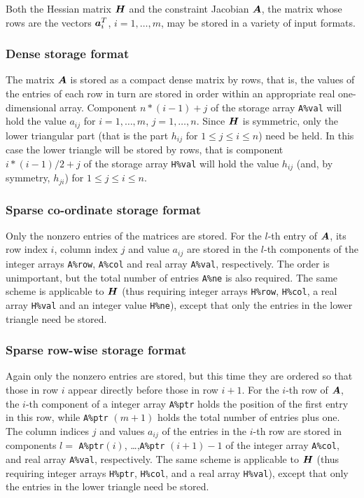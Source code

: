 \documentclass{galahad}
\begin{document}

\galmatrix
Both the Hessian matrix ${\bm{H}}$ and
the constraint Jacobian ${\bm{A}}$, the matrix
whose rows are the vectors ${\bm{a}}_{i}^{T}$, $i = 1, \ldots , m$,
may be stored in a variety of input formats.

\subsubsection{Dense storage format}\label{dense}
The matrix ${\bm{A}}$ is stored as a compact
dense matrix by rows, that is, the values of the entries of each row in turn are
stored in order within an appropriate real one-dimensional array.
Component $n \ast (i-1) + j$ of the storage array {\tt A\%val} will hold the
value $a_{ij}$ for $i = 1, \ldots , m$, $j = 1, \ldots , n$.
Since ${\bm{H}}$ is symmetric, only the lower triangular part (that is the part
$h_{ij}$ for $1 \leq j \leq i \leq n$) need be held. In this case
the lower triangle will be stored by rows, that is
component $i \ast (i-1)/2 + j$ of the storage array {\tt H\%val}
will hold the value $h_{ij}$ (and, by symmetry, $h_{ji}$)
for $1 \leq j \leq i \leq n$.

\subsubsection{Sparse co-ordinate storage format}\label{coordinate}
Only the nonzero entries of the matrices are stored. For the
$l$-th entry of ${\bm{A}}$, its row index $i$, column index $j$
and value $a_{ij}$
are stored in the $l$-th components of the integer arrays {\tt A\%row},
{\tt A\%col} and real array {\tt A\%val}, respectively.
The order is unimportant, but the total
number of entries {\tt A\%ne} is also required.
The same scheme is applicable to
${\bm{H}}$ (thus requiring integer arrays {\tt H\%row}, {\tt H\%col}, a real array
{\tt H\%val} and an integer value {\tt H\%ne}),
except that only the entries in the lower triangle need be stored.

\subsubsection{Sparse row-wise storage format}\label{rowwise}
Again only the nonzero entries are stored, but this time
they are ordered so that those in row $i$ appear directly before those
in row $i+1$. For the $i$-th row of ${\bm{A}}$, the $i$-th component of a
integer array {\tt A\%ptr} holds the position of the first entry in this row,
while {\tt A\%ptr} $(m+1)$ holds the total number of entries plus one.
The column indices $j$ and values $a_{ij}$ of the entries in the $i$-th row
are stored in components
$l =$ {\tt A\%ptr}$(i)$, \ldots ,{\tt A\%ptr} $(i+1)-1$ of the
integer array {\tt A\%col}, and real array {\tt A\%val}, respectively.
The same scheme is applicable to
${\bm{H}}$ (thus requiring integer arrays {\tt H\%ptr}, {\tt H\%col}, and
a real array {\tt H\%val}),
except that only the entries in the lower triangle need be stored.
\end{document}
